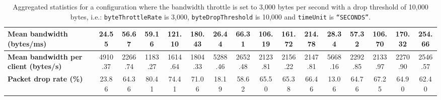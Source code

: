 \begin{table}[!h]
{\begin{tabular}{|l|ccccc|ccccc|ccccc|}
            \textbf{Mean bandwidth (bytes/ms)} & \multicolumn{1}{c|}{24.55} & \multicolumn{1}{c|}{56.67}
            & \multicolumn{1}{c|}{59.16}
            & \multicolumn{1}{c|}{121.10}
            & \multicolumn{1}{c|}{180.43}
            & \multicolumn{1}{c|}{26.44}
            & \multicolumn{1}{c|}{66.31}
            & \multicolumn{1}{c|}{106.19}
            & \multicolumn{1}{c|}{161.72}
            & \multicolumn{1}{c|}{214.78}
            & \multicolumn{1}{c|}{28.34}
            & \multicolumn{1}{c|}{57.32}
            & \multicolumn{1}{c|}{106.70}
            & \multicolumn{1}{c|}{170.32}
            & \multicolumn{1}{c|}{254.66}
            \\ \hline
            \textbf{Mean bandwidth per client (bytes/s)} & \multicolumn{1}{c|}{4910.37} & \multicolumn{1}{c|}{2266.74}
            & \multicolumn{1}{c|}{1183.27}
            & \multicolumn{1}{c|}{1614.64}
            & \multicolumn{1}{c|}{1804.33}
            & \multicolumn{1}{c|}{5288.46}
            & \multicolumn{1}{c|}{2652.48}
            & \multicolumn{1}{c|}{2123.81}
            & \multicolumn{1}{c|}{2156.22}
            & \multicolumn{1}{c|}{2147.81}
            & \multicolumn{1}{c|}{5668.16}
            & \multicolumn{1}{c|}{2292.85}
            & \multicolumn{1}{c|}{2133.97}
            & \multicolumn{1}{c|}{2270.90}
            & \multicolumn{1}{c|}{2546.57}
            \\ \hline
            \textbf{Packet drop rate (\%)} & \multicolumn{1}{c|}{23.86} & \multicolumn{1}{c|}{64.36}
            & \multicolumn{1}{c|}{80.41}
            & \multicolumn{1}{c|}{74.41}
            & \multicolumn{1}{c|}{71.06}
            & \multicolumn{1}{c|}{18.19}
            & \multicolumn{1}{c|}{58.62}
            & \multicolumn{1}{c|}{65.50}
            & \multicolumn{1}{c|}{65.38}
            & \multicolumn{1}{c|}{66.46}
            & \multicolumn{1}{c|}{13.06}
            & \multicolumn{1}{c|}{64.76}
            & \multicolumn{1}{c|}{67.25}
            & \multicolumn{1}{c|}{64.90}
            & \multicolumn{1}{c|}{62.40}
            \\ \hline
        \end{tabular}
    }
    \caption{Aggregated statistics for a configuration where the bandwidth throttle is set to 3,000 bytes per second
    with a drop threshold of 10,000 bytes, i.e.: \texttt{byteThrottleRate} is 3,000, \texttt{byteDropThreshold} is
    10,000 and \texttt{timeUnit} is \texttt{``SECONDS''}.}
    \label{table:analysis_results_throttle}
\end{table}


